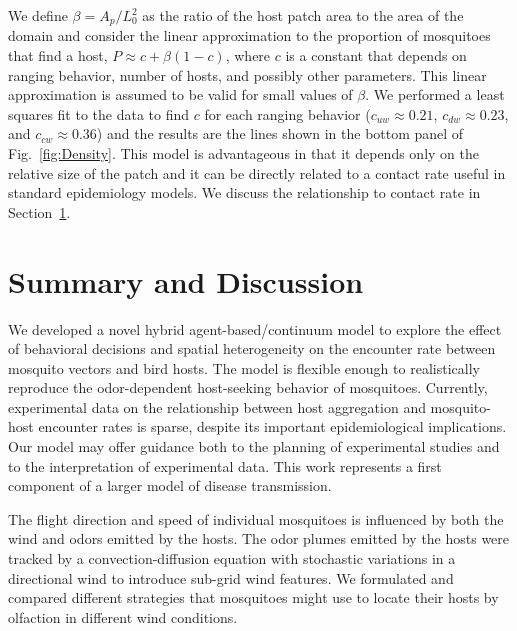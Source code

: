\documentclass[12pt]{article}
\newif\ifcommentsw
\newcommand{\comment}[1]{\ifcommentsw  $\blacktriangleright$\ \textbf{#1}\ $\blacktriangleleft$ \fi}
\newif\ifnotesw
\newcommand{\notes}[1]{\ifnotesw  $\bullet$\ \textit{ \textbf{#1}}\ $\bullet$ \fi}
\begin{document}
We define $\beta = A_p/L_0^2$ as the ratio of the host patch area to the area of the domain and consider the linear approximation to the proportion of mosquitoes that find a host, $P  \approx c + \beta(1-c)$, where $c$ is a constant that depends on ranging behavior, number of hosts, and possibly other parameters. This linear approximation is assumed to be valid for small values of $\beta$.  We performed a least squares fit to the data to find $c$ for each ranging behavior ($c_{uw} \approx 0.21$, $c_{dw} \approx 0.23$, and $c_{cw} \approx 0.36$) and the results are the lines shown in the bottom panel of Fig.~\ref{fig:Density}.
This model is advantageous in that it depends only on the relative size of the patch and it can be directly related to a contact rate useful in standard epidemiology models. We discuss the relationship to contact rate in Section~\ref{sec:summary}.


\section{Summary and Discussion}\label{sec:summary}
	 	We developed a novel hybrid agent-based/continuum model
to explore the effect of behavioral decisions and spatial heterogeneity on the encounter
rate between mosquito vectors and bird hosts. The model is flexible enough to
realistically reproduce the odor-dependent host-seeking
behavior of mosquitoes. Currently,
experimental data on the relationship between host aggregation and mosquito-host encounter rates is sparse, despite its important epidemiological implications. Our
model may offer guidance both to the planning of experimental
studies and to the interpretation of experimental data.  This work represents a first component
of  a larger model of disease transmission.


The flight direction and speed of individual mosquitoes is influenced by both the wind and odors
emitted by the hosts. The odor plumes emitted by the hosts were
tracked by a convection-diffusion equation with stochastic
variations in a directional wind to introduce sub-grid wind features. We formulated and compared
different strategies that mosquitoes might use to locate their hosts by olfaction in different wind
conditions.

\end{document}
